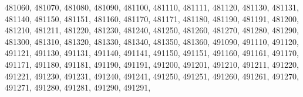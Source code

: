 \textquotesingle{}481060\textquotesingle{}, \textquotesingle{}481070\textquotesingle{}, \textquotesingle{}481080\textquotesingle{}, \textquotesingle{}481090\textquotesingle{}, \textquotesingle{}481100\textquotesingle{}, \textquotesingle{}481110\textquotesingle{}, \textquotesingle{}481111\textquotesingle{}, \textquotesingle{}481120\textquotesingle{}, \textquotesingle{}481130\textquotesingle{}, \textquotesingle{}481131\textquotesingle{}, \textquotesingle{}481140\textquotesingle{}, \textquotesingle{}481150\textquotesingle{}, \textquotesingle{}481151\textquotesingle{}, \textquotesingle{}481160\textquotesingle{}, \textquotesingle{}481170\textquotesingle{}, \textquotesingle{}481171\textquotesingle{}, \textquotesingle{}481180\textquotesingle{}, \textquotesingle{}481190\textquotesingle{}, \textquotesingle{}481191\textquotesingle{}, \textquotesingle{}481200\textquotesingle{}, \textquotesingle{}481210\textquotesingle{}, \textquotesingle{}481211\textquotesingle{}, \textquotesingle{}481220\textquotesingle{}, \textquotesingle{}481230\textquotesingle{}, \textquotesingle{}481240\textquotesingle{}, \textquotesingle{}481250\textquotesingle{}, \textquotesingle{}481260\textquotesingle{}, \textquotesingle{}481270\textquotesingle{}, \textquotesingle{}481280\textquotesingle{}, \textquotesingle{}481290\textquotesingle{}, \textquotesingle{}481300\textquotesingle{}, \textquotesingle{}481310\textquotesingle{}, \textquotesingle{}481320\textquotesingle{}, \textquotesingle{}481330\textquotesingle{}, \textquotesingle{}481340\textquotesingle{}, \textquotesingle{}481350\textquotesingle{}, \textquotesingle{}481360\textquotesingle{}, \textquotesingle{}491090\textquotesingle{}, \textquotesingle{}491110\textquotesingle{}, \textquotesingle{}491120\textquotesingle{}, \textquotesingle{}491121\textquotesingle{}, \textquotesingle{}491130\textquotesingle{}, \textquotesingle{}491131\textquotesingle{}, \textquotesingle{}491140\textquotesingle{}, \textquotesingle{}491141\textquotesingle{}, \textquotesingle{}491150\textquotesingle{}, \textquotesingle{}491151\textquotesingle{}, \textquotesingle{}491160\textquotesingle{}, \textquotesingle{}491161\textquotesingle{}, \textquotesingle{}491170\textquotesingle{}, \textquotesingle{}491171\textquotesingle{}, \textquotesingle{}491180\textquotesingle{}, \textquotesingle{}491181\textquotesingle{}, \textquotesingle{}491190\textquotesingle{}, \textquotesingle{}491191\textquotesingle{}, \textquotesingle{}491200\textquotesingle{}, \textquotesingle{}491201\textquotesingle{}, \textquotesingle{}491210\textquotesingle{}, \textquotesingle{}491211\textquotesingle{}, \textquotesingle{}491220\textquotesingle{}, \textquotesingle{}491221\textquotesingle{}, \textquotesingle{}491230\textquotesingle{}, \textquotesingle{}491231\textquotesingle{}, \textquotesingle{}491240\textquotesingle{}, \textquotesingle{}491241\textquotesingle{}, \textquotesingle{}491250\textquotesingle{}, \textquotesingle{}491251\textquotesingle{}, \textquotesingle{}491260\textquotesingle{}, \textquotesingle{}491261\textquotesingle{}, \textquotesingle{}491270\textquotesingle{}, \textquotesingle{}491271\textquotesingle{}, \textquotesingle{}491280\textquotesingle{}, \textquotesingle{}491281\textquotesingle{}, \textquotesingle{}491290\textquotesingle{}, \textquotesingle{}491291\textquotesingle{}, 